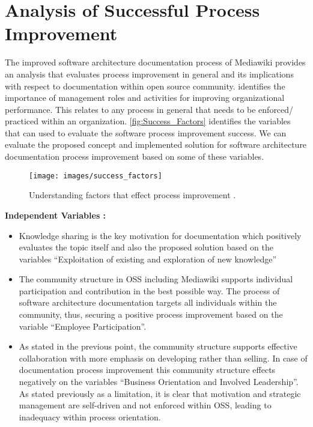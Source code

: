 \section{Analysis of Successful Process Improvement}
The improved software architecture documentation process of Mediawiki provides an analysis that evaluates process improvement in general and its implications with respect to documentation within open source community. \cite{Dyba2005} identifies the importance of management roles and activities for improving organizational performance. This relates to any process in general that needs to be enforced/ practiced within an organization.
\newline
\autoref{fig:Success_Factors} identifies the variables that can used to evaluate the software process improvement success. We can evaluate the proposed concept and implemented solution for software architecture documentation process improvement based on some of these variables.
\begin{figure}[H]
  \centering
  \texttt{[image: images/success\_factors]}
  \caption[Understanding factors that effect process improvement]{Understanding factors that effect process improvement \cite{Dyba2005}.}\label{fig:Success_Factors}
\end{figure}

\textbf{Independent Variables : } 
\begin{itemize}
\item Knowledge sharing is the key motivation for documentation which positively evaluates the topic itself and also the proposed solution based on the variables \enquote{Exploitation of existing and exploration of new knowledge}
\item The community structure in OSS including Mediawiki supports individual participation and contribution in the best possible way. The process of software architecture documentation targets all individuals within the community, thus, securing a positive process improvement based on the variable \enquote{Employee Participation}.
\item As stated in the previous point, the community structure supports effective collaboration with more emphasis on developing rather than selling. In case of documentation process improvement this community structure effects negatively on the variables \enquote{Business Orientation and Involved Leadership}. As stated previously as a limitation, it is clear that motivation and strategic management are self-driven and not enforced within OSS, leading to inadequacy within process orientation.
\end{itemize}

